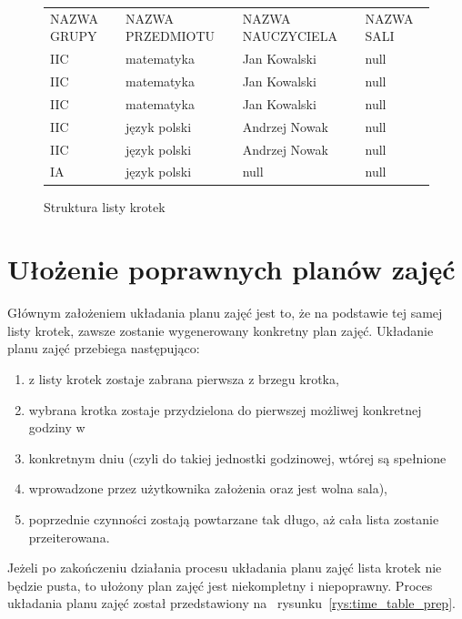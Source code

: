 \begin{figure}[h]
\begin{tabular}{llll}
NAZWA GRUPY & NAZWA PRZEDMIOTU & NAZWA NAUCZYCIELA & NAZWA SALI \\
IIC         & matematyka       & Jan Kowalski      & null       \\
IIC         & matematyka       & Jan Kowalski      & null       \\
IIC         & matematyka       & Jan Kowalski      & null       \\
IIC         & język polski     & Andrzej Nowak     & null       \\
IIC         & język polski     & Andrzej Nowak     & null       \\
IA          & język polski     & null              & null      
\end{tabular}
\caption{Struktura listy krotek} \label{rys:krotki}
\end{figure}

\section{Ułożenie poprawnych planów zajęć}

    Głównym założeniem układania planu zajęć jest to, że na podstawie tej samej listy krotek, zawsze zostanie wygenerowany konkretny plan zajęć. 
Układanie planu zajęć przebiega następująco:
\begin{enumerate}
	\item z listy krotek zostaje zabrana pierwsza z brzegu krotka,
	\item wybrana krotka zostaje przydzielona do pierwszej możliwej konkretnej godziny w 		\item konkretnym dniu (czyli do takiej jednostki godzinowej, wtórej są spełnione 			\item wprowadzone przez użytkownika założenia oraz jest wolna sala),
	\item poprzednie czynności zostają powtarzane tak długo, aż cała lista zostanie przeiterowana.
\end{enumerate}
Jeżeli po zakończeniu działania procesu układania planu zajęć lista krotek nie będzie pusta, to ułożony plan zajęć jest niekompletny i niepoprawny. Proces układania planu zajęć został przedstawiony na ~rysunku~\ref{rys:time_table_prep}.

